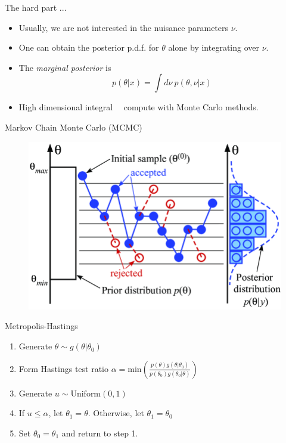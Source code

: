\documentclass[
aspectratio=169,
14pt,
professionalfonts
]{beamer}
\newcommand{\arrow}{~\ding{220}~}
\begin{document}
\begin{frame}{The hard part ...}
\begin{itemize}
    \item Usually, we are not interested in the nuisance parameters $\nu$.
    \item One can obtain the posterior p.d.f. for $\theta$ alone by integrating over $\nu$.
    \item The \textit{marginal posterior} is 
        $$
        p(\theta | x) = \int d\nu ~ p(\theta, \nu | x)
        $$
    \item High dimensional integral \arrow compute with Monte Carlo methods.    
\end{itemize}
\end{frame}

\begin{frame}{Markov Chain Monte Carlo (MCMC)}
    \begin{figure}
        \centering
        \includegraphics[width=0.6\linewidth]{../plots/mcmc_diagram.png}
    \end{figure}
\end{frame}

\begin{frame}{Metropolis-Hastings}

\begin{enumerate}
    \item Generate $\theta \sim g(\theta|\theta_0)$
    \item Form Hastings test ratio $\alpha = \text{min}\left( \frac{p(\theta)g(\theta|\theta_0)}{p(\theta_0)g(\theta_0|\theta)}\right)$
    \item Generate $u \sim \text{Uniform}(0, 1)$
    \item If $u \leq \alpha$, let $\theta_1 = \theta$. Otherwise, let $\theta_1 = \theta_0$
    \item Set  $\theta_0 = \theta_1$ and return to step 1.
\end{enumerate}
    
\end{frame}
\end{document}
